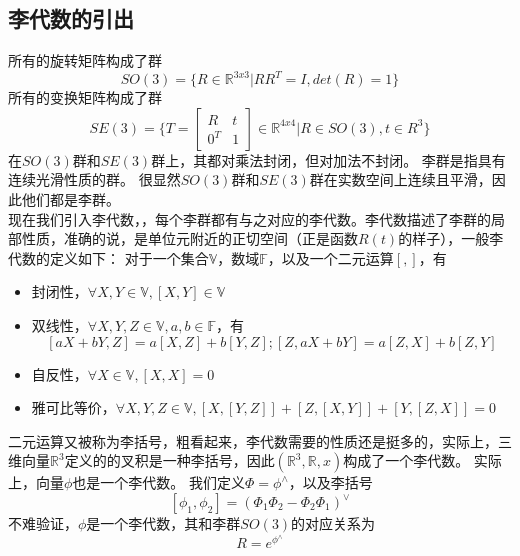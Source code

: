 \subsection{李代数的引出}
所有的旋转矩阵构成了群
\[
    SO(3) = \{R \in \mathbb{R}^{3x3} | RR^T = I, det(R) = 1\}
\]
所有的变换矩阵构成了群
\[
    SE(3) = \{T = \begin{bmatrix} R & t \\ 0^T & 1\end{bmatrix} \in \mathbb{R}^{4x4} | R \in SO(3), t \in R^3\}
\]
在\(SO(3)\)群和\(SE(3)\)群上，其都对乘法封闭，但对加法不封闭。{\color{red} 李群是指具有连续光滑性质的群。}
很显然\(SO(3)\)群和\(SE(3)\)群在实数空间上连续且平滑，因此他们都是李群。\\
现在我们引入李代数，，每个李群都有与之对应的李代数。李代数描述了李群的局部性质，准确的说，是单位元附近的正切空间（正是函数\(R(t)\)的样子），一般李代数的定义如下：
对于一个集合\(\mathbb{V}\)，数域\(\mathbb{F}\)，以及一个二元运算\([,]\)，有
\begin{itemize}
    \item 封闭性，\(\forall X, Y \in \mathbb{V}, [X, Y] \in \mathbb{V}\)
    \item 双线性，\(\forall X, Y, Z \in \mathbb{V}, a, b \in \mathbb{F}\)，有
          \[
              [aX + bY, Z] = a[X, Z] + b[Y, Z]; [Z, aX + bY] = a[Z, X] + b[Z, Y]
          \]
    \item 自反性，\(\forall X \in \mathbb{V}, [X, X]=0\)
    \item 雅可比等价，\(\forall X, Y, Z \in \mathbb{V}, [X, [Y, Z]] + [Z, [X, Y]] + [Y, [Z, X]] = 0\)
\end{itemize}
二元运算又被称为李括号，粗看起来，李代数需要的性质还是挺多的，实际上，三维向量\(\mathbb{R}^3\)定义的的叉积是一种李括号，因此\((\mathbb{R}^3, \mathbb{R}, x)\)构成了一个李代数。{\color{red} 实际上，向量\(\phi\)也是一个李代数。}
我们定义\(\Phi = \phi^\wedge\)，以及李括号
\[
    [\phi_1, \phi_2] = (\Phi_1\Phi_2-\Phi_2\Phi_1)^\vee
\]
不难验证，\(\phi\)是一个李代数，其和李群\(SO(3)\)的对应关系为
\[
    R = e^{\phi^\wedge}
\]


